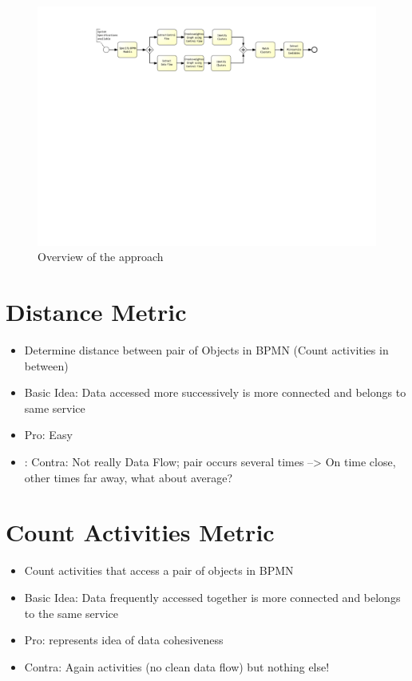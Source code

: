 \begin{figure}[h!]
	\includegraphics[width=\textwidth, trim={7.5cm 15.3cm 5.0cm 1.5cm}]{img/ThesisProcess.pdf}
	\caption{Overview of the approach}
	\label{fig:thesisProcess}
\end{figure}












\section{Distance Metric}
\begin{itemize}
	\item Determine distance between pair of Objects in BPMN (Count activities in between)
	\item Basic Idea: Data accessed more successively is more connected and belongs to same service
	\item Pro: Easy
	\item: Contra: Not really Data Flow; pair  occurs several times --> On time close, other times far away, what about average?
\end{itemize}

\section{Count Activities Metric}
\begin{itemize}
	\item Count activities that access a pair of objects in BPMN
	\item Basic Idea: Data frequently accessed together is more connected and belongs to the same service
	\item Pro: represents idea of data cohesiveness
	\item Contra: Again activities (no clean data flow) but nothing else!

\end{itemize}





